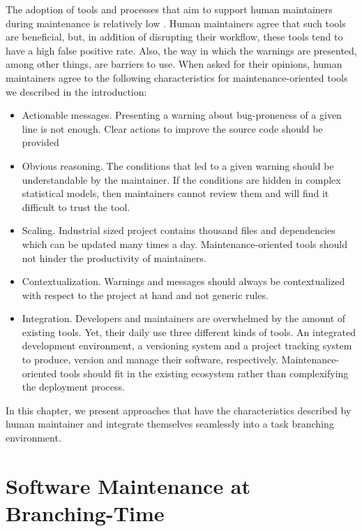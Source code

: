 The adoption of tools and processes that aim to support human maintainers during maintenance is relatively low \cite{Lewis2013,Foss2015,Layman2007,Ayewah2007,Ayewah2008,Johnson2013,Norman2013, Lopez2011}.
Human maintainers agree that such tools are beneficial, but, in addition of disrupting their workflow, these tools tend to have a high false positive rate.
Also, the way in which the warnings are presented, among other things, are barriers to use\cite{Johnson2013}.
When asked for their opinions, human maintainers agree to the following characteristics for maintenance-oriented tools\cite{Hovemeyer2004, Lopez2011, Lewis2013} we described in the introduction:

\begin{itemize}
	\item Actionable messages. Presenting a warning about bug-proneness of a given line is not enough.
	Clear actions to improve the source code should be provided
	\item Obvious reasoning. The conditions that led to a given warning should be understandable by the maintainer.
	If the conditions are hidden in complex statistical models, then maintainers cannot review them and will find it difficult to trust the tool.
	\item Scaling. Industrial sized project contains thousand files and dependencies which can be updated many times a day.
	Maintenance-oriented tools should not hinder the productivity of maintainers.
	\item Contextualization. Warnings and messages should always be contextualized with respect to the project at hand and not generic rules.
	\item Integration. Developers and maintainers are overwhelmed by the amount of existing tools.
	Yet, their daily use three different kinds of tools.
	An integrated development environment, a versioning system and a project tracking system to produce, version and manage their software, respectively.
	Maintenance-oriented tools should fit in the existing ecosystem rather than complexifying the deployment process.
\end{itemize}

In this chapter, we present approaches that have the characteristics described by human maintainer and integrate themselves seamlessly into a task branching environment.

\section{Software Maintenance at Branching-Time}


